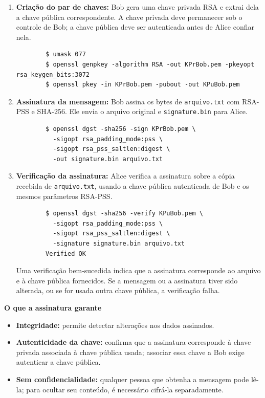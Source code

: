 \documentclass{article}
\begin{document}
\begin{enumerate}
	\item \textbf{Criação do par de chaves:}
	Bob gera uma chave privada RSA e extrai dela a chave pública correspondente. A chave privada deve permanecer sob o controle de Bob; a chave pública deve ser autenticada antes de Alice confiar nela.
	\begin{tcolorbox}[width=\textwidth]
	{\small
		\begin{verbatim}
		$ umask 077
		$ openssl genpkey -algorithm RSA -out KPrBob.pem -pkeyopt rsa_keygen_bits:3072
		$ openssl pkey -in KPrBob.pem -pubout -out KPuBob.pem
		\end{verbatim}
	}
	\end{tcolorbox}

	\item \textbf{Assinatura da mensagem:}
	Bob assina os bytes de \texttt{arquivo.txt} com RSA-PSS e SHA-256. Ele envia o arquivo original e \texttt{signature.bin} para Alice.
	\begin{tcolorbox}[width=\textwidth]
	{\small
		\begin{verbatim}
		$ openssl dgst -sha256 -sign KPrBob.pem \
		  -sigopt rsa_padding_mode:pss \
		  -sigopt rsa_pss_saltlen:digest \
		  -out signature.bin arquivo.txt
		\end{verbatim}
	}
	\end{tcolorbox}

	\item \textbf{Verificação da assinatura:}
	Alice verifica a assinatura sobre a cópia recebida de \texttt{arquivo.txt}, usando a chave pública autenticada de Bob e os mesmos parâmetros RSA-PSS.
	\begin{tcolorbox}[width=\textwidth]
	{\small
		\begin{verbatim}
		$ openssl dgst -sha256 -verify KPuBob.pem \
		  -sigopt rsa_padding_mode:pss \
		  -sigopt rsa_pss_saltlen:digest \
		  -signature signature.bin arquivo.txt
		Verified OK
		\end{verbatim}
	}
	\end{tcolorbox}
	Uma verificação bem-sucedida indica que a assinatura corresponde ao arquivo e à chave pública fornecidos. Se a mensagem ou a assinatura tiver sido alterada, ou se for usada outra chave pública, a verificação falha.
\end{enumerate}

\textbf{O que a assinatura garante}

\begin{itemize}
	\item \textbf{Integridade:} permite detectar alterações nos dados assinados.
	\item \textbf{Autenticidade da chave:} confirma que a assinatura corresponde à chave privada associada à chave pública usada; associar essa chave a Bob exige autenticar a chave pública.
	\item \textbf{Sem confidencialidade:} qualquer pessoa que obtenha a mensagem pode lê-la; para ocultar seu conteúdo, é necessário cifrá-la separadamente.
\end{itemize}
\end{document}
